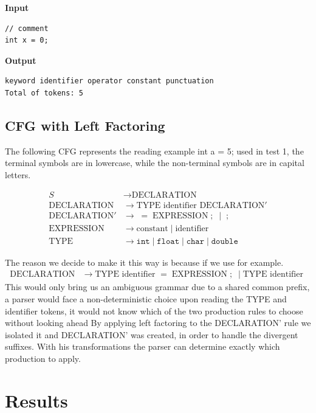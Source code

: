 \documentclass[letterpaper,12pt,oneside]{article}
\begin{document}
\textbf{Input}

\begin{verbatim}
// comment
int x = 0;
\end{verbatim}

\textbf{Output}

\begin{verbatim}
keyword identifier operator constant punctuation
Total of tokens: 5
\end{verbatim}


\subsection{CFG with Left Factoring}
The following CFG represents the reading example int a = 5; used in test 1, the terminal symbols are in lowercase, while the non-terminal symbols are in capital letters.

\begin{align*}
S &\rightarrow \text{DECLARATION} \\
\text{DECLARATION} &\rightarrow \text{TYPE identifier DECLARATION}' \\
\text{DECLARATION}' &\rightarrow\;=\; \text{EXPRESSION} \;;\; \mid \;;\; \\
\text{EXPRESSION} &\rightarrow \text{constant} \mid \text{identifier} \\
\text{TYPE} &\rightarrow \texttt{int} \mid \texttt{float} \mid \texttt{char} \mid \texttt{double}
\end{align*}

The reason we decide to make it this way is because if we use for example.
\begin{align*}
\text{DECLARATION} &\rightarrow \text{TYPE identifier } =\; \text{EXPRESSION} \;;\; \mid \text{TYPE identifier }
\end{align*}
This would only bring us an ambiguous grammar due to a shared common prefix,  a parser would face a non-deterministic choice upon reading the TYPE and identifier tokens, it would not know which of the two production rules to choose without looking ahead
By applying left factoring to the DECLARATION' rule we isolated it and DECLARATION' was created, in order to handle the divergent suffixes. With his transformations the parser can determine exactly which production to apply.

\section{Results}
\end{document}
